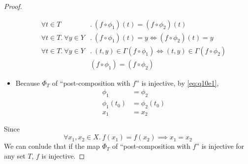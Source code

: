 \documentclass[12pt]{article}
\begin{document}
\begin{proof}
\begin{itemize}[label={}]
\begin{align*}
                \forall t \in T&.~(f \circ \phi_1)(t) = (f \circ \phi_2)(t)\\
                \forall t \in T.~ \forall y \in Y&.~
                    (f \circ \phi_1)(t) = y \iff (f \circ \phi_2)(t) = y\\
                \forall t \in T.~ \forall y \in Y&.~
                    (t,y) \in \Gamma(f \circ \phi_1) \iff (t,y) \in \Gamma(f \circ \phi_2)\\
                &(f \circ \phi_1) = (f \circ \phi_2)
            \end{align*}
        \item Because $\Phi_T$ of ``post-composition with $f$'' is injective, by \eqref{eq:q10e1},
            \begin{align*}
                \phi_1 &= \phi_2\\
                \phi_1(t_0) &= \phi_2(t_0)\\
                x_1 &= x_2
            \end{align*}
    \end{itemize}
    Since $$\forall x_1, x_2 \in X.~ f(x_1) = f(x_2) \implies x_1 = x_2$$
    We can conlude that if the map $\Phi_T$ of ``post-composition with $f$'' is injective for any set $T$, $f$ is injective.
\end{proof}
\newpage
\end{document}
